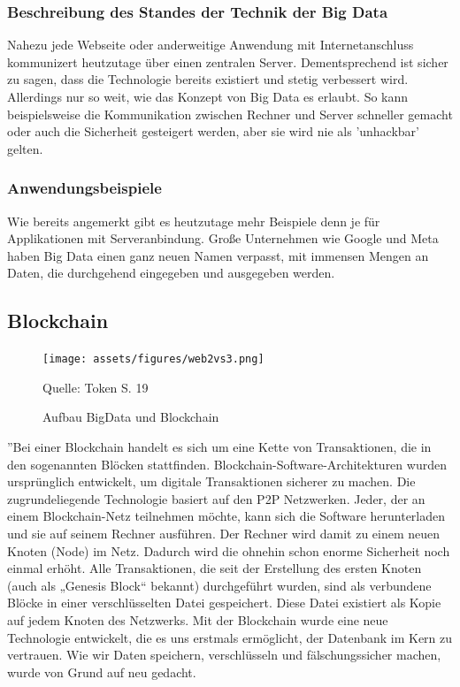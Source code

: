 \subsubsection{Beschreibung des Standes der Technik der Big Data}
Nahezu jede Webseite oder anderweitige Anwendung mit Internetanschluss kommunizert heutzutage über einen zentralen Server. 
Dementsprechend ist sicher zu sagen, dass die Technologie bereits existiert und stetig verbessert wird.
Allerdings nur so weit, wie das Konzept von Big Data es erlaubt. 
So kann beispielsweise die Kommunikation zwischen Rechner und Server schneller gemacht oder auch die Sicherheit gesteigert werden, aber sie wird nie als 'unhackbar' gelten.

\subsubsection{Anwendungsbeispiele}
Wie bereits angemerkt gibt es heutzutage mehr Beispiele denn je für Applikationen mit Serveranbindung.
Große Unternehmen wie Google und Meta haben Big Data einen ganz neuen Namen verpasst, mit immensen Mengen an Daten, die durchgehend eingegeben und ausgegeben werden.




\newpage

\subsection{Blockchain}
\begin{figure}[!ht]
    \caption{Aufbau BigData und Blockchain}
    \texttt{[image: assets/figures/web2vs3.png]}
    \begin{flushleft}
        Quelle: Token S. 19
    \end{flushleft}
    \label{fig:birds1}
\end{figure}

”Bei einer Blockchain handelt es sich um eine Kette von Transaktionen, die in den sogenannten Blöcken stattfinden. Blockchain-Software-Architekturen wurden ursprünglich entwickelt, um digitale Transaktionen sicherer zu machen. Die zugrundeliegende Technologie basiert auf den P2P Netzwerken. Jeder, der an einem Blockchain-Netz teilnehmen möchte, kann sich die Software herunterladen und sie auf seinem Rechner ausführen. Der Rechner wird damit zu einem neuen Knoten (Node) im Netz. Dadurch wird die ohnehin schon enorme Sicherheit noch einmal erhöht. Alle Transaktionen, die seit der Erstellung des ersten Knoten (auch als  „Genesis Block“ bekannt) durchgeführt wurden, sind als verbundene Blöcke in einer verschlüsselten Datei gespeichert. Diese Datei existiert als Kopie auf jedem Knoten des Netzwerks. Mit der Blockchain wurde eine neue Technologie entwickelt, die es uns erstmals ermöglicht, der Datenbank im Kern zu vertrauen. Wie wir Daten speichern, verschlüsseln und fälschungssicher machen, wurde von Grund auf neu gedacht.

